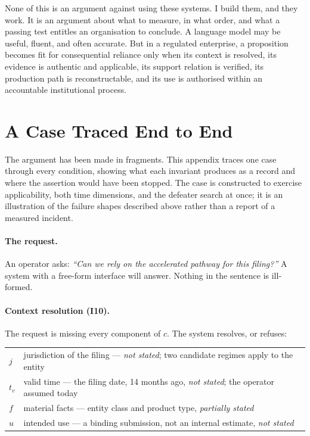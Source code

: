 \documentclass[11pt]{article}
\theoremstyle{plain}
\theoremstyle{definition}
\begin{document}
None of this is an argument against using these systems. I build them, and they
work. It is an argument about what to measure, in what order, and what a passing
test entitles an organisation to conclude. A language model may be useful, fluent,
and often accurate. But in a regulated enterprise, a proposition becomes fit for
consequential reliance only when its context is resolved, its evidence is authentic
and applicable, its support relation is verified, its production path is
reconstructable, and its use is authorised within an accountable institutional
process.


\appendix
\section{A Case Traced End to End}
\label{sec:worked}

The argument has been made in fragments. This appendix traces one case through every
condition, showing what each invariant produces as a record and where the assertion
would have been stopped. The case is constructed to exercise applicability, both time
dimensions, and the defeater search at once; it is an illustration of the failure shapes
described above rather than a report of a measured incident.

\paragraph{The request.} An operator asks: \emph{``Can we rely on the accelerated
pathway for this filing?''} A system with a free-form interface will answer. Nothing in
the sentence is ill-formed.

\paragraph{Context resolution (I10).} The request is missing every component of $c$. The
system resolves, or refuses:

\begin{center}
\small
\begin{tabular}{@{}l>{\raggedright\arraybackslash}p{8.9cm}@{}}
\toprule
$j$ & jurisdiction of the filing --- \emph{not stated}; two candidate regimes apply to
      the entity \\
$t_v$ & valid time --- the filing date, 14 months ago, \emph{not stated}; the operator
      assumed today \\
$f$ & material facts --- entity class and product type, \emph{partially stated} \\
$u$ & intended use --- a binding submission, not an internal estimate,
      \emph{not stated} \\
\bottomrule
\end{tabular}
\end{center}
\end{document}
